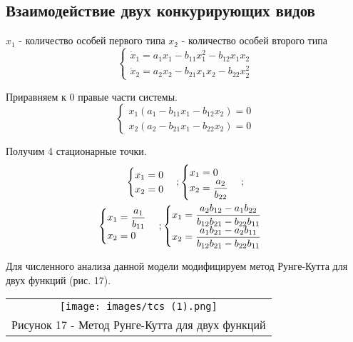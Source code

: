 \subsection{Взаимодействие двух конкурирующих видов}
$x_1$ - количество особей первого типа
$x_2$ - количество особей второго типа
\begin{equation}
  \begin{cases}
    \dot{x}_1=a_1x_1-b_{11}x_1^2-b_{12}x_1x_2\\
    \dot{x}_2=a_2x_2-b_{21}x_1x_2-b_{22}x_2^2
  \end{cases}
\end{equation}

Приравняем к 0 правые части системы.
\begin{equation}
  \begin{cases}
    x_1(a_1-b_{11}x_1-b_{12}x_2)=0\\
    x_2(a_2-b_{21}x_1-b_{22}x_2)=0
  \end{cases}
\end{equation}

Получим 4 стационарные точки.
\begin{gather}
  \begin{cases}
    x_1=0\\
    x_2=0
  \end{cases};
  \begin{cases}
    x_1=0\\
    x_2=\dfrac{a_2}{b_{22}}
  \end{cases};\\
  \begin{cases}
    x_1=\dfrac{a_1}{b_{11}}\\
    x_2=0
  \end{cases};
  \begin{cases}
    x_1=\dfrac{a_2b_{12}-a_1b_{22}}{b_{12}b_{21}-b_{22}b_{11}}\\
    x_2=\dfrac{a_1b_{21}-a_2b_{11}}{b_{12}b_{21}-b_{22}b_{11}}
  \end{cases}\notag
\end{gather}


Для численного анализа данной модели модифицируем метод Рунге-Кутта для двух функций (рис. 17).
\begin{center}
  \begin{tabular}{c}
    \texttt{[image: images/tcs (1).png]}\\
    Рисунок 17 - Метод Рунге-Кутта для двух функций
  \end{tabular}
\end{center}

